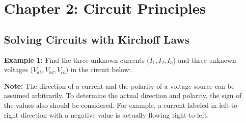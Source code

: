 \usepackage{html}
\textwidth 6.0in
\topmargin -0.5in
\oddsidemargin -0in
\evensidemargin -0.5in


\section*{Chapter 2: Circuit Principles}

\subsection*{Solving Circuits with Kirchoff Laws}

{\bf Example 1:} Find the three unknown currents ($I_1,I_2,I_3$) and three 
	unknown voltages ($V_{ab}, V_{bd}, V_{cb}$) in the circuit below:


{\bf Note:} The direction of a current and the polarity of a voltage source 
can be assumed arbitrarily. To determine the actual direction and polarity, 
the sign of the values also should be considered. For example, a current 
labeled in left-to-right direction with a negative value is actually flowing 
right-to-left.

